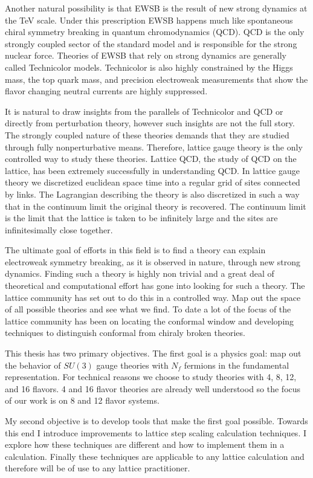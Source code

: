 Another natural possibility is that EWSB is the result of new strong dynamics at the TeV scale.
Under this prescription EWSB happens much like spontaneous chiral symmetry breaking in quantum chromodynamics (QCD).
QCD is the only strongly coupled sector of the standard model and is responsible for the strong nuclear force.
Theories of EWSB that rely on strong dynamics are generally called Technicolor models.
Technicolor is also highly constrained by the Higgs mass, the top quark mass, and precision electroweak measurements that show the flavor changing neutral currents are highly suppressed.

It is natural to draw insights from the parallels of Technicolor and QCD or directly from perturbation theory, however such insights are not the full story.
The strongly coupled nature of these theories demands that they are studied through fully nonperturbative means.
Therefore, lattice gauge theory is the only controlled way to study these theories.
Lattice QCD, the study of QCD on the lattice, has been extremely successfully in understanding QCD.
In lattice gauge theory we discretized euclidean space time into a regular grid of sites connected by links.
The Lagrangian describing the theory is also discretized in such a way that in the continuum limit the original theory is recovered.
The continuum limit is the limit that the lattice is taken to be infinitely large and the sites are infinitesimally close together.

The ultimate goal of efforts in this field is to find a theory can explain electroweak symmetry breaking, as it is observed in nature, through new strong dynamics.
Finding such a theory is highly non trivial and a great deal of theoretical and computational effort has gone into looking for such a theory.
The lattice community has set out to do this in a controlled way.
Map out the space of all possible theories and see what we find.
To date a lot of the focus of the lattice community has been on locating the conformal window and developing techniques to distinguish conformal from chiraly broken theories.

This thesis has two primary objectives.
The first goal is a physics goal:  map out the behavior of $SU(3)$ gauge theories with $N_f$ fermions in the fundamental representation.
For technical reasons we choose to study theories with 4, 8, 12, and 16 flavors.
4 and 16 flavor theories are already well understood so the focus of our work is on 8 and 12 flavor systems.

My second objective is to develop tools that make the first goal possible.
Towards this end I introduce improvements to lattice step scaling calculation techniques.
I explore how these techniques are different and how to implement them in a calculation.
Finally these techniques are applicable to any lattice calculation and therefore will be of use to any lattice practitioner.

